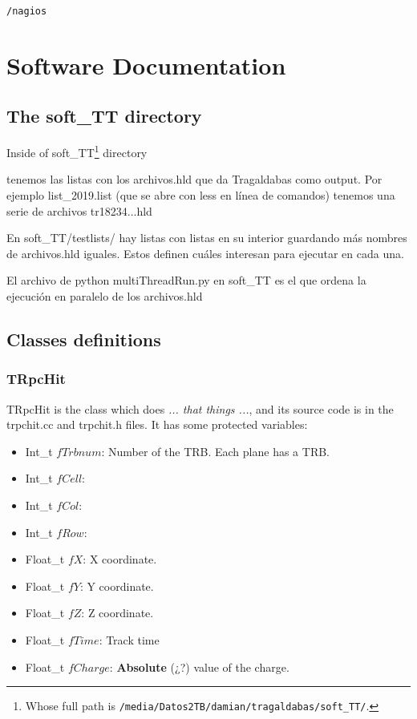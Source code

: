 \documentclass[a4paper]{book}
\begin{document}
\texttt{/nagios}




\chapter{Software Documentation}



\section{The soft\_TT directory}

Inside of soft\_TT\footnote{Whose full path is \texttt{/media/Datos2TB/damian/tragaldabas/soft\_TT/}.} directory

tenemos las listas con los archivos.hld que da Tragaldabas como output. Por ejemplo list\_2019.list (que se abre con less en línea de comandos) tenemos una serie de archivos tr18234...hld

En soft\_TT/testlists/ hay listas con listas en su interior guardando más nombres de archivos.hld iguales. Estos definen cuáles interesan para ejecutar en cada una.

El archivo de python multiThreadRun.py en soft\_TT es el que ordena la ejecución en paralelo de los archivos.hld

\section{Classes definitions}

\subsection{TRpcHit}

TRpcHit is the class which does \textit{... that things ...}, and its source code is in the trpchit.cc and trpchit.h files. It has some protected variables:

\begin{itemize}
    \item Int\_t $fTrbnum$: Number of the TRB. Each plane has a TRB.
    \item Int\_t $fCell$: 
    \item Int\_t $fCol$: 
    \item Int\_t $fRow$: 
    \item Float\_t $fX$: X coordinate.
    \item Float\_t $fY$: Y coordinate.
    \item Float\_t $fZ$: Z coordinate.
    \item Float\_t $fTime$: Track time
    \item Float\_t $fCharge$: \textbf{Absolute} (¿?) value of the charge.
\end{itemize}
\end{document}
